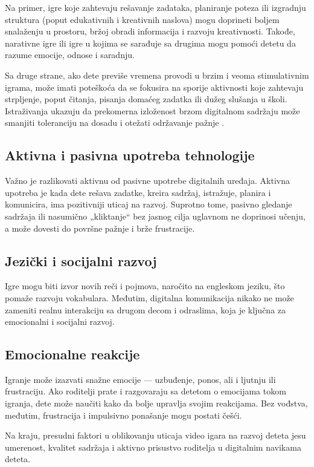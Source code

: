 \documentclass[a4paper,12pt]{article}
\begin{document}
Na primer, igre koje zahtevaju rešavanje zadataka, planiranje poteza ili izgradnju struktura (poput edukativnih i kreativnih naslova) mogu doprineti boljem snalaženju u prostoru, bržoj obradi informacija i razvoju kreativnosti. Takođe, narativne igre ili igre u kojima se sarađuje sa drugima mogu pomoći detetu da razume emocije, odnose i saradnju.

Sa druge strane, ako dete previše vremena provodi u brzim i veoma stimulativnim igrama, može imati poteškoća da se fokusira na sporije aktivnosti koje zahtevaju strpljenje, poput čitanja, pisanja domaćeg zadatka ili dužeg slušanja u školi. Istraživanja ukazuju da prekomerna izloženost brzom digitalnom sadržaju može smanjiti toleranciju na dosadu i otežati održavanje pažnje \cite{anderson2010violent}.


\subsection*{Aktivna i pasivna upotreba tehnologije}
Važno je razlikovati aktivnu od pasivne upotrebe digitalnih uređaja. 
Aktivna upotreba je kada dete rešava zadatke, kreira sadržaj, istražuje, planira i komunicira, ima pozitivniji uticaj na razvoj. 
Suprotno tome, pasivno gledanje sadržaja ili nasumično „kliktanje“ bez jasnog cilja uglavnom ne doprinosi učenju, a može dovesti do površne pažnje i brže frustracije.

\subsection*{Jezički i socijalni razvoj}
Igre mogu biti izvor novih reči i pojmova, naročito na engleskom jeziku, što pomaže razvoju vokabulara. Međutim, digitalna komunikacija nikako ne može zameniti realnu interakciju sa drugom decom i odraslima, koja je ključna za emocionalni i socijalni razvoj.

\subsection*{Emocionalne reakcije}
Igranje može izazvati snažne emocije — uzbuđenje, ponos, ali i ljutnju ili frustraciju. 
Ako roditelji prate i razgovaraju sa detetom o emocijama tokom igranja, dete može naučiti kako da bolje upravlja svojim reakcijama. 
Bez vođstva, međutim, frustracija i impulsivno ponašanje mogu postati češći.

\bigskip

Na kraju, presudni faktori u oblikovanju uticaja video igara na razvoj deteta jesu umerenost, kvalitet sadržaja i aktivno prisustvo roditelja u digitalnim navikama deteta.
\end{document}
